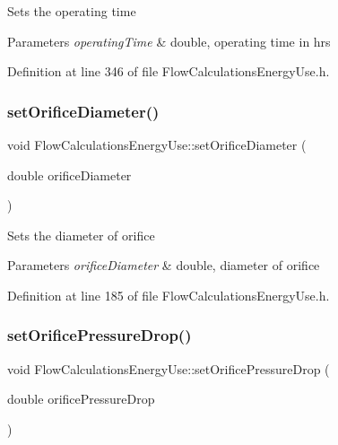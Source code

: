 Sets the operating time


\begin{DoxyParams}{Parameters}
{\em operating\+Time} & double, operating time in hrs \\
\hline
\end{DoxyParams}


Definition at line 346 of file Flow\+Calculations\+Energy\+Use.\+h.

\mbox{\label{class_flow_calculations_energy_use_a31116dc6381ad3fd9d2214da7ee3dd1b}} 
\subsubsection{\texorpdfstring{set\+Orifice\+Diameter()}{setOrificeDiameter()}}
{\footnotesize\ttfamily void Flow\+Calculations\+Energy\+Use\+::set\+Orifice\+Diameter (\begin{DoxyParamCaption}\item[{double}]{orifice\+Diameter }\end{DoxyParamCaption})\hspace{0.3cm}{\ttfamily [inline]}}

Sets the diameter of orifice


\begin{DoxyParams}{Parameters}
{\em orifice\+Diameter} & double, diameter of orifice \\
\hline
\end{DoxyParams}


Definition at line 185 of file Flow\+Calculations\+Energy\+Use.\+h.

\mbox{\label{class_flow_calculations_energy_use_ad4b324ecd8288d44c32d622bb26b1bff}} 
\subsubsection{\texorpdfstring{set\+Orifice\+Pressure\+Drop()}{setOrificePressureDrop()}}
{\footnotesize\ttfamily void Flow\+Calculations\+Energy\+Use\+::set\+Orifice\+Pressure\+Drop (\begin{DoxyParamCaption}\item[{double}]{orifice\+Pressure\+Drop }\end{DoxyParamCaption})\hspace{0.3cm}{\ttfamily [inline]}}

